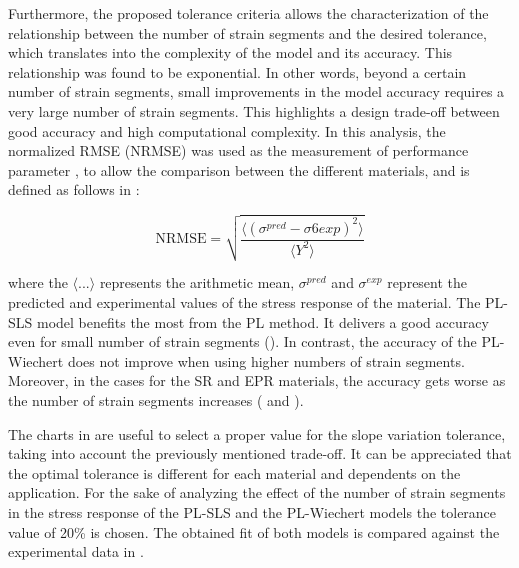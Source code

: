 Furthermore, the proposed tolerance criteria allows the characterization of the relationship between the number of strain segments and the desired tolerance, which translates into the complexity of the model and its accuracy. This relationship was found to be exponential. In other words, beyond a certain number of strain segments, small improvements in the model accuracy requires a very large number of strain segments. This highlights a design trade-off between good accuracy and high computational complexity. In this analysis, the normalized RMSE (NRMSE) was used as the measurement of performance parameter \cite{bergstrom2015mechanics}, to allow the comparison between the different materials, and is defined as follows in :

\begin{equation}
    \mathrm{NRMSE} = \sqrt{  \frac{\langle (\sigma^{pred} - \sigma6{exp})^2 \rangle}{\langle Y^2 \rangle} }
\label{eq2}
\end{equation}

\noindent where the  $\langle ... \rangle$ represents the arithmetic mean, $\sigma^{pred}$ and $\sigma^{exp}$ represent the predicted and experimental values of the stress response of the material. The PL-SLS model benefits the most from the PL method. It delivers a good accuracy even for small number of strain segments (). In contrast, the accuracy of the PL-Wiechert does not improve when using higher numbers of strain segments. Moreover, in the cases for the SR and EPR materials, the accuracy gets worse as the number of strain segments increases ( and ).

The charts in  are useful to select a proper value for the slope variation tolerance, taking into account the previously mentioned trade-off. It can be appreciated that the optimal tolerance is different for each material and dependents on the application. For the sake of analyzing the effect of the number of strain segments in the stress response of the PL-SLS and the PL-Wiechert models the tolerance value of 20\% is chosen. The obtained fit of both models is compared against the experimental data in .

